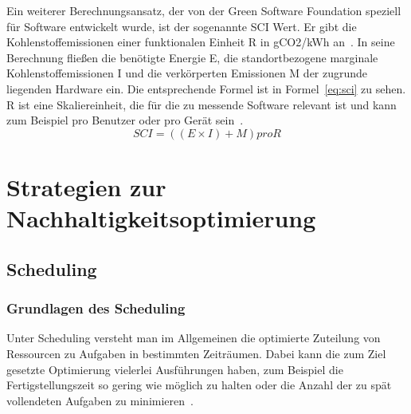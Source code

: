 Ein weiterer Berechnungsansatz, der von der Green Software Foundation speziell für Software entwickelt wurde, ist der sogenannte \ac{SCI} Wert.
Er gibt die Kohlenstoffemissionen einer funktionalen Einheit R in g\ac{CO2}/\ac{kWh} an~\cite{GreenSoftwareFoundation.2022}.
In seine Berechnung fließen die benötigte Energie E, die standortbezogene marginale Kohlenstoffemissionen I und die verkörperten Emissionen M der zugrunde liegenden Hardware ein.
Die entsprechende Formel ist in Formel~\ref{eq:sci} zu sehen.
R ist eine Skaliereinheit, die für die zu messende Software relevant ist und kann zum Beispiel pro Benutzer oder pro Gerät sein~\cite{Buchanan.2023}.
\begin{equation}
 \label{eq:sci}
 SCI = ((E \times I) + M) pro R
\end{equation}

\chapter{Strategien zur Nachhaltigkeitsoptimierung}
\section{Scheduling}
\subsection{Grundlagen des Scheduling}
Unter Scheduling versteht man im Allgemeinen die optimierte Zuteilung von Ressourcen zu Aufgaben in bestimmten Zeiträumen.
Dabei kann die zum Ziel gesetzte Optimierung vielerlei Ausführungen haben, zum Beispiel die Fertigstellungszeit so gering wie möglich zu halten oder die Anzahl der zu spät vollendeten Aufgaben zu minimieren~\cite{Gawiejnowicz.2020}.


